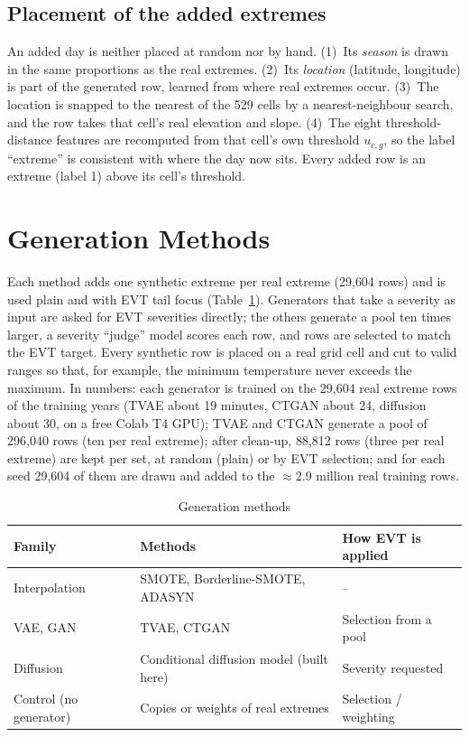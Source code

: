 \documentclass[12pt,a4paper]{report}
\begin{document}
\subsection{Placement of the added extremes}
An added day is neither placed at random nor by hand. (1)~Its \emph{season} is drawn in the same proportions as the
real extremes. (2)~Its \emph{location} (latitude, longitude) is part of the generated row, learned from where real
extremes occur. (3)~The location is snapped to the nearest of the 529 cells by a nearest-neighbour search, and the row
takes that cell's real elevation and slope. (4)~The eight threshold-distance features are recomputed from that cell's
own threshold $u_{c,g}$, so the label ``extreme'' is consistent with where the day now sits. Every added row is an
extreme (label 1) above its cell's threshold.

\section{Generation Methods}
Each method adds one synthetic extreme per real extreme (29{,}604 rows) and is used plain and with EVT tail focus
(Table~\ref{tab:methods}). Generators that take a severity as input are asked for EVT severities directly; the others
generate a pool ten times larger, a severity ``judge'' model scores each row, and rows are selected to match the EVT
target. Every synthetic row is placed on a real grid cell and cut to valid ranges so that, for example, the minimum
temperature never exceeds the maximum. In numbers: each generator is trained on the 29{,}604 real extreme rows of the training
years (TVAE about 19 minutes, CTGAN about 24, diffusion about 30, on a free Colab T4 GPU); TVAE and CTGAN generate a
pool of 296{,}040 rows (ten per real extreme); after clean-up, 88{,}812 rows (three per real extreme) are kept per set,
at random (plain) or by EVT selection; and for each seed 29{,}604 of them are drawn and added to the
$\approx$2.9 million real training rows.

\begin{table}[H]
\centering
\caption{Generation methods}
\label{tab:methods}
\small
\begin{tabular}{|l|l|l|}
\hline
\textbf{Family} & \textbf{Methods} & \textbf{How EVT is applied}\\ \hline
Interpolation & SMOTE, Borderline-SMOTE, ADASYN & -- \\ \hline
VAE, GAN & TVAE, CTGAN & Selection from a pool \\ \hline
Diffusion & Conditional diffusion model (built here) & Severity requested \\ \hline
Control (no generator) & Copies or weights of real extremes & Selection / weighting \\ \hline
\end{tabular}
\end{table}
\end{document}

